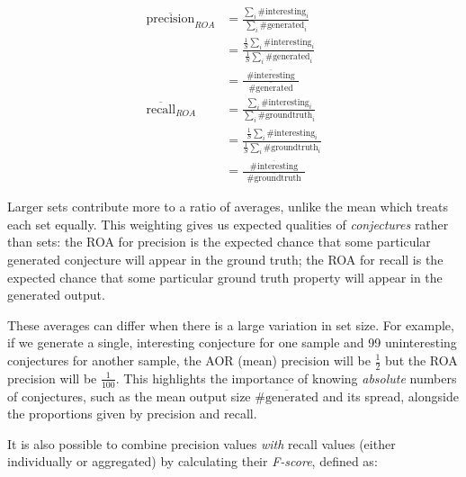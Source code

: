 \begin{align*}
       \overline{\text{precision}}_{ROA}
    &= \frac{\sum_i{\#\text{interesting}_i}}
            {\sum_i{\#\text{generated}_i}}                              \\
    &= \frac{\frac{1}{S} \sum_i{\#\text{interesting}_i}}
            {\frac{1}{S} \sum_i{\#\text{generated}_i}}                  \\
    &= \frac{\hspace{5pt} \overline{\#\text{interesting}} \hspace{5pt}}
            {\hspace{5pt} \overline{\#\text{generated}}   \hspace{5pt}} \\[10pt]
       \overline{\text{recall}}_{ROA}
    &= \frac{\sum_i{\#\text{interesting}_i}}
            {\sum_i{\#\text{groundtruth}_i}}                            \\
    &= \frac{\frac{1}{S} \sum_i{\#\text{interesting}_i}}
            {\frac{1}{S} \sum_i{\#\text{groundtruth}_i}}                \\
    &= \frac{\hspace{5pt} \overline{\#\text{interesting}} \hspace{5pt}}
            {\hspace{5pt} \overline{\#\text{groundtruth}} \hspace{5pt}}
\end{align*}

Larger sets contribute more to a ratio of averages, unlike the mean which treats
each set equally. This weighting gives us expected qualities of
\emph{conjectures} rather than sets: the ROA for precision is the expected
chance that some particular generated conjecture will appear in the ground
truth; the ROA for recall is the expected chance that some particular ground
truth property will appear in the generated output.

These averages can differ when there is a large variation in set size. For
example, if we generate a single, interesting conjecture for one sample and 99
uninteresting conjectures for another sample, the AOR (mean) precision will be
$\frac{1}{2}$ but the ROA precision will be $\frac{1}{100}$. This highlights the
importance of knowing \emph{absolute} numbers of conjectures, such as the mean
output size $\overline{\#\text{generated}}$ and its spread, alongside the
proportions given by precision and recall.

It is also possible to combine precision values \emph{with} recall values
(either individually or aggregated) by calculating their \emph{F-score}, defined
as:

